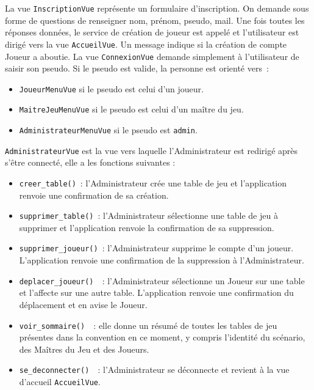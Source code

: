 \documentclass[11pt]{article}
\begin{document}
\bigbreak

La vue \texttt{InscriptionVue} représente un formulaire d'inscription. On demande sous forme de questions de renseigner nom, prénom, pseudo, mail. Une fois toutes les réponses données, le service de création de joueur est appelé et l'utilisateur est dirigé vers la vue \texttt{AccueilVue}. Un message indique si la création de compte Joueur a aboutie. La vue \texttt{ConnexionVue} demande simplement à l'utilisateur de saisir son pseudo. Si le pseudo est valide, la personne est orienté vers~:
\begin{itemize}[label=, font=\small]
    \item \texttt{JoueurMenuVue} si le pseudo est celui d'un joueur.
    \item \texttt{MaitreJeuMenuVue} si le pseudo est celui d'un maître du jeu.
    \item \texttt{AdministrateurMenuVue} si le pseudo est \texttt{admin}.
\end{itemize}




\bigbreak


\texttt{AdministrateurVue} est la vue vers laquelle l'Administrateur est redirigé après s'être connecté, elle a les fonctions suivantes :
\begin{itemize}[label=, font=\small]
    \item \texttt{creer\_table()}~: l'Administrateur crée une table de jeu et l'application renvoie une confirmation de sa création. 
    \item \texttt{supprimer\_table()}~: l'Administrateur sélectionne une table de jeu à supprimer et l'application renvoie la confirmation de sa suppression.
    \item \texttt{supprimer\_joueur()}~: l'Administrateur supprime le compte d'un joueur. L'application renvoie une confirmation de la suppression à l'Administrateur.
    \item \texttt{deplacer\_joueur() }~: l'Administrateur sélectionne un Joueur sur une table et l'affecte sur une autre table. L'application renvoie une confirmation du déplacement et en avise le Joueur.
    \item \texttt{voir\_sommaire() }~: elle donne un résumé de toutes les tables de jeu présentes dans la convention en ce moment, y compris l'identité du scénario, des Maîtres du Jeu et des Joueurs.
    \item \texttt{se\_deconnecter() }~: l'Administrateur se déconnecte et revient à la vue d'accueil \texttt{AccueilVue}.
\end{itemize}
\bigbreak
\end{document}
